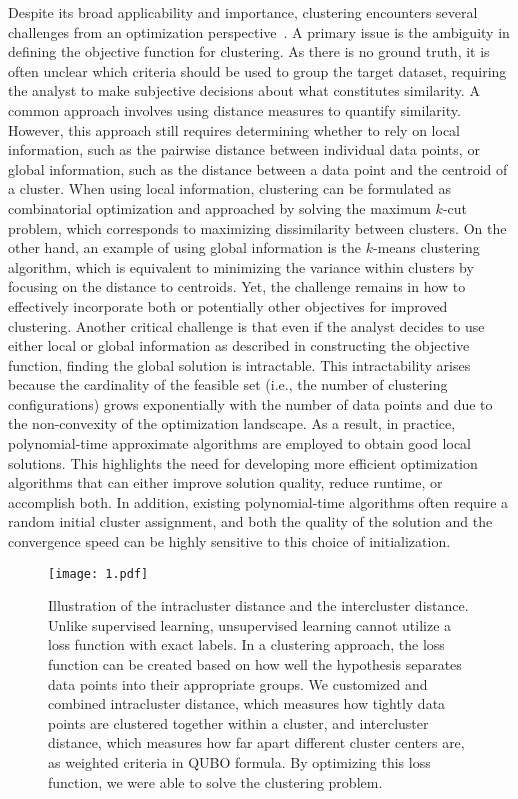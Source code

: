 \documentclass[showpacs,twocolumn,superscriptaddress]{revtex4-2}
\begin{document}
Despite its broad applicability and importance, clustering encounters several challenges from an optimization perspective~\cite{jain2010data,xu2015comprehensive,ezugwu2022comprehensive}. A primary issue is the ambiguity in defining the objective function for clustering. As there is no ground truth, it is often unclear which criteria should be used to group the target dataset, requiring the analyst to make subjective decisions about what constitutes similarity. A common approach involves using distance measures to quantify similarity. 
However, this approach still requires determining whether to rely on local information, such as the pairwise distance between individual data points, or global information, such as the distance between a data point and the centroid of a cluster. When using local information, clustering can be formulated as combinatorial optimization and approached by solving the maximum $k$-cut problem, which corresponds to maximizing dissimilarity between clusters. On the other hand, an example of using global information is the $k$-means clustering algorithm, which is equivalent to minimizing the variance within clusters by focusing on the distance to centroids. Yet, the challenge remains in how to effectively incorporate both or potentially other objectives for improved clustering. Another critical challenge is that even if the analyst decides to use either local or global information as described in constructing the objective function, finding the global solution is intractable. This intractability arises because the cardinality of the feasible set (i.e., the number of clustering configurations) grows exponentially with the number of data points and due to the non-convexity of the optimization landscape. 
As a result, in practice, polynomial-time approximate algorithms are employed to obtain good local solutions. This highlights the need for developing more efficient optimization algorithms that can either improve solution quality, reduce runtime, or accomplish both. In addition, existing polynomial-time algorithms often require a random initial cluster assignment, and both the quality of the solution and the convergence speed can be highly sensitive to this choice of initialization.
\begin{figure}[!h]
    \begin{center}
    \texttt{[image: 1.pdf]}    
    \end{center}
    \caption{Illustration of the intracluster distance and the intercluster distance. Unlike supervised learning, unsupervised learning cannot utilize a loss function with exact labels. In a clustering approach, the loss function can be created based on how well the hypothesis separates data points into their appropriate groups. We customized and combined intracluster distance, which measures how tightly data points are clustered together within a cluster, and intercluster distance, which measures how far apart different cluster centers are, as weighted criteria in QUBO formula. By optimizing this loss function, we were able to solve the clustering problem.}\label{fig:1}
\end{figure}
\end{document}
